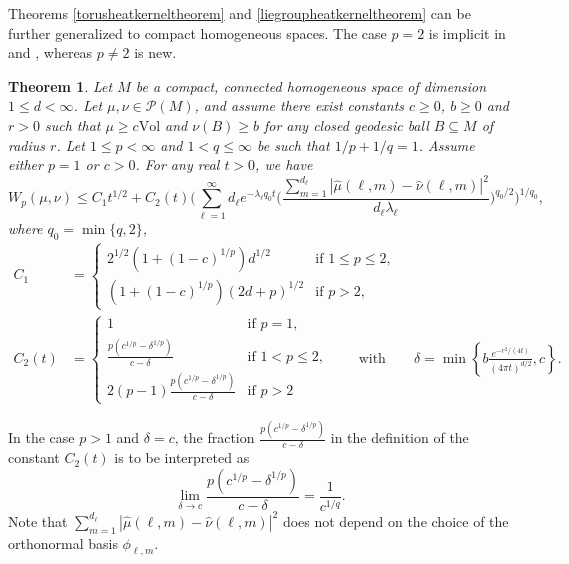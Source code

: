 \documentclass[11pt,a4paper]{article}
\newtheorem{thm}{Theorem}
\theoremstyle{definition}
\begin{document}
Theorems \ref{torusheatkerneltheorem} and \ref{liegroupheatkerneltheorem} can be further generalized to compact homogeneous spaces. The case $p=2$ is implicit in \cite{BOR2} and \cite{BS}, whereas $p \neq 2$ is new.
\begin{thm}\label{homogeneousheatkerneltheorem} Let $M$ be a compact, connected homogeneous space of dimension $1 \le d < \infty$. Let $\mu, \nu \in \mathcal{P}(M)$, and assume there exist constants $c \ge 0$, $b \ge 0$ and $r>0$ such that $\mu \ge c \mathrm{Vol}$ and $\nu(B) \ge b$ for any closed geodesic ball $B \subseteq M$ of radius $r$. Let $1 \le p < \infty$ and $1<q \le \infty$ be such that $1/p+1/q=1$. Assume either $p=1$ or $c>0$. For any real $t>0$, we have
\[ W_p (\mu, \nu) \le C_1 t^{1/2} + C_2(t) \bigg( \sum_{\ell=1}^{\infty} d_{\ell} e^{-\lambda_{\ell} q_0 t} \bigg( \frac{\sum_{m=1}^{d_{\ell}} |\widehat{\mu}(\ell,m) - \widehat{\nu}(\ell, m)|^2}{d_{\ell} \lambda_{\ell}} \bigg)^{q_0/2} \bigg)^{1/q_0}, \]
where $q_0 = \min \{ q, 2 \}$,
\[ \begin{split} C_1 &= \left\{ \begin{array}{ll} 2^{1/2} (1+(1-c)^{1/p}) d^{1/2} & \textrm{if } 1 \le p \le 2, \\ (1+(1-c)^{1/p}) (2d+p)^{1/2} & \textrm{if } p>2, \end{array} \right. \\ C_2(t) &=\left\{ \begin{array}{ll} 1 & \textrm{if } p=1, \\ \frac{p(c^{1/p}-\delta^{1/p})}{c-\delta} & \textrm{if } 1<p \le 2, \\ 2(p-1) \frac{p(c^{1/p}-\delta^{1/p})}{c-\delta} & \textrm{if } p>2 \end{array} \right. \qquad \textrm{with} \qquad \delta=\min \left\{ b \frac{e^{-r^2 /(4t)}}{(4 \pi t)^{d/2}} , c \right\} . \end{split} \]
\end{thm}
\noindent In the case $p>1$ and $\delta=c$, the fraction $\frac{p(c^{1/p} - \delta^{1/p})}{c-\delta}$ in the definition of the constant $C_2(t)$ is to be interpreted as
\[ \lim_{\delta \to c} \frac{p(c^{1/p} - \delta^{1/p})}{c-\delta} = \frac{1}{c^{1/q}} . \]
Note that $\sum_{m=1}^{d_{\ell}} |\widehat{\mu}(\ell,m) - \widehat{\nu} (\ell,m)|^2$ does not depend on the choice of the orthonormal basis $\phi_{\ell,m}$.
\end{document}
